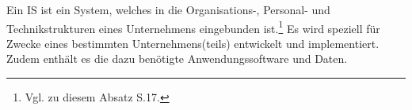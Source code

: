 Ein \ac{IS} ist ein System, welches in die Organisations-, Personal- und Technikstrukturen eines Unternehmens eingebunden ist.\footnote{Vgl. zu diesem Absatz \cite{Laudon.2009} S.17.} 
Es wird speziell für Zwecke eines bestimmten Unternehmens(teils) entwickelt und implementiert.
Zudem enthält es die dazu benötigte Anwendungssoftware und Daten.